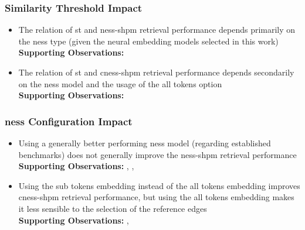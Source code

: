 \documentclass[11pt]{scrreprt}
\begin{document}
{\begin{itemize}
\end{itemize}


\subsubsection{Similarity Threshold Impact}

\begin{itemize}

\item The relation of \gls{st} and \gls{ness-shpm} retrieval performance depends primarily on the \gls{ness} type (given the neural embedding models selected in this work)\\
\textbf{Supporting Observations:}   

\item The relation of \gls{st} and \gls{cness-shpm} retrieval performance depends secondarily on the \gls{ness} model and the usage of the all tokens option \\
\textbf{Supporting Observations:}   

\end{itemize}


\subsubsection{\gls{ness} Configuration Impact}

\begin{itemize}

\item Using a generally better performing \gls{ness} model (regarding established benchmarks) does not generally improve the \gls{ness-shpm} retrieval performance \\
\textbf{Supporting Observations:} , , 

\item Using the sub tokens embedding instead of the all tokens embedding improves \gls{cness-shpm} retrieval performance, but using the all tokens embedding makes it less sensible to the selection of the reference edges
\\ \textbf{Supporting Observations:} , 


\end{itemize}}
\end{document}
